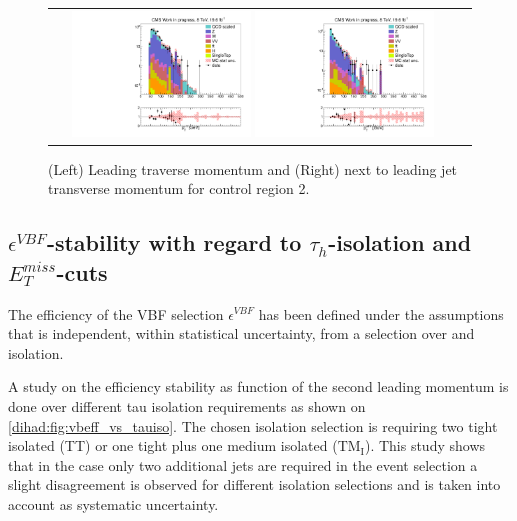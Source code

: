 \begin{figure}[tbh!]
	\centering
	\begin{tabular}{cc}
		\includegraphics[width=0.45\textwidth]{PLOTS/diTauHadLSQCDPlots/AllMCdiced/OS_CR2/OS_Central_invertedVBF_2TightIso_CR2/h_tau1pt_log.pdf}
		\includegraphics[width=0.45\textwidth]{PLOTS/diTauHadLSQCDPlots/AllMCdiced/OS_CR2/OS_Central_invertedVBF_2TightIso_CR2/h_jet2pt_log.pdf} 		
	\end{tabular}
	\caption{(Left) Leading \hadtau traverse momentum and (Right) next to leading jet transverse momentum for control region 2.}
	\label{fig::CR2_controlplots2}
\end{figure}

\subsection{$\epsilon^{VBF}$-stability with regard to $\tau_{h}$-isolation and $E_{T}^{miss}$-cuts}
\label{dihad:subsec:stability}

The efficiency of the VBF selection $\epsilon^{VBF}$ has been defined under the assumptions that is independent, within statistical uncertainty, from a selection over \met and \hadtau isolation.
 
 A study on the efficiency stability as function of the second leading \hadtau momentum is done over different tau isolation requirements as shown on \autoref{dihad:fig:vbeff_vs_tauiso}. The chosen \hadtau isolation selection is requiring two tight isolated \hadtau (TT) or one tight plus one medium isolated \hadtau ($\text{TM}_{\text{I}}$). This study shows that in the case only two additional jets are required in the event selection a slight disagreement is observed for different isolation selections and is taken into account as systematic uncertainty.

